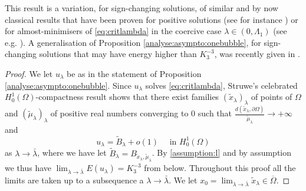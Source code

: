 \documentclass[10pt]{amsart}
\numberwithin{equation}{section}
\newcommand{\Om}{\Omega}
\theoremstyle{plain}
\theoremstyle{remark}
\begin{document}
This result is a variation, for sign-changing solutions, of similar and by now classical results that have been proven for positive solutions (see for instance \cite{Druetdim3, FrankKonigKovarik3, Rey}) or for almost-minimisers of \eqref{eq:critlambda} in the coercive case $\lambda \in (0, \Lambda_1)$ (see e.g. \cite{FrankKonigKovarik3autre}). A generalisation of Proposition \ref{analyse:asympto:onebubble}, for sign-changing solutions that may have energy higher than $K_3^{-3}$, was recently given in \cite{CheikhAliPremoselli}. 

\begin{proof}
We let $u_\lambda$ be as in the statement of Proposition \ref{analyse:asympto:onebubble}. Since $u_\lambda$ solves \eqref{eq:critlambda}, Struwe's celebrated $H^1_0(\Om)$-compactness result \cite[Chap. III, Theorem 3.1]{StruweVariationalMethods} shows that there exist families $(\tilde{x}_\lambda)_{\lambda}$ of points of $\Om$ and $(\tilde{\mu}_\lambda)_{\lambda}$ of positive real numbers converging to $0$ such that $\frac{d(\tilde{x}_\lambda, \partial \Om)}{\tilde{\mu}_\lambda} \to + \infty$ and 
\begin{equation} \label{assumption:l}
 u_\lambda = \tilde{B}_\lambda + o(1) \quad \text{  in } H^1_0(\Om)
 \end{equation}
 as $\lambda \to \bar{\lambda}$, where we have let $\tilde{B}_\lambda = B_{\tilde{x}_\lambda, \tilde{\mu}_\lambda}$. By \eqref{assumption:l} and by assumption we thus have $\lim_{\lambda \to \bar{\lambda}} E(u_\lambda) = K_3^{-3}$ from below. Throughout this proof all the limits are taken up to a subsequence a $\lambda \to \bar{\lambda}$. We let $x_0 = \lim_{\lambda \to \bar{\lambda}} \tilde{x}_\lambda \in \overline{\Om}$.  
 \medskip
 

\end{proof}
\end{document}
